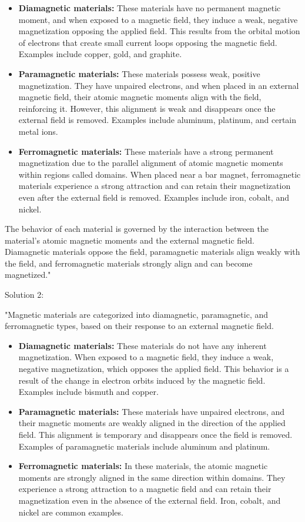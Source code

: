 \begin{itemize}
    \item \textbf{Diamagnetic materials:} These materials have no permanent magnetic moment, and when exposed to a magnetic field, they induce a weak, negative magnetization opposing the applied field. This results from the orbital motion of electrons that create small current loops opposing the magnetic field. Examples include copper, gold, and graphite.
    \item \textbf{Paramagnetic materials:} These materials possess weak, positive magnetization. They have unpaired electrons, and when placed in an external magnetic field, their atomic magnetic moments align with the field, reinforcing it. However, this alignment is weak and disappears once the external field is removed. Examples include aluminum, platinum, and certain metal ions.
    \item \textbf{Ferromagnetic materials:} These materials have a strong permanent magnetization due to the parallel alignment of atomic magnetic moments within regions called domains. When placed near a bar magnet, ferromagnetic materials experience a strong attraction and can retain their magnetization even after the external field is removed. Examples include iron, cobalt, and nickel.
\end{itemize}

The behavior of each material is governed by the interaction between the material's atomic magnetic moments and the external magnetic field. Diamagnetic materials oppose the field, paramagnetic materials align weakly with the field, and ferromagnetic materials strongly align and can become magnetized."

Solution 2: 

"Magnetic materials are categorized into diamagnetic, paramagnetic, and ferromagnetic types, based on their response to an external magnetic field.

\begin{itemize}
    \item \textbf{Diamagnetic materials:} These materials do not have any inherent magnetization. When exposed to a magnetic field, they induce a weak, negative magnetization, which opposes the applied field. This behavior is a result of the change in electron orbits induced by the magnetic field. Examples include bismuth and copper.
    \item \textbf{Paramagnetic materials:} These materials have unpaired electrons, and their magnetic moments are weakly aligned in the direction of the applied field. This alignment is temporary and disappears once the field is removed. Examples of paramagnetic materials include aluminum and platinum.
    \item \textbf{Ferromagnetic materials:} In these materials, the atomic magnetic moments are strongly aligned in the same direction within domains. They experience a strong attraction to a magnetic field and can retain their magnetization even in the absence of the external field. Iron, cobalt, and nickel are common examples.
\end{itemize}

